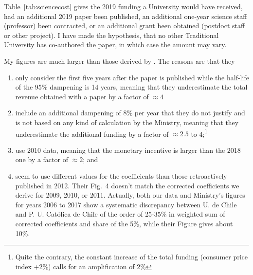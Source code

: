 \documentclass[twocolumn]{article}
\begin{document}
Table~\ref{tab:sciencecost} gives the 2019 funding a University would have received, had an additional 2019 paper been published, an additional one-year science staff (professor) been contracted, or an additional grant been obtained (postdoct staff or other project).  I have made the hypothesis, that no other Traditional University has co-authored the paper, in which case the amount may vary. 

My figures are much larger than those derived by \citet{RAM12}.  The reasons are that they
\begin{enumerate}
\item only consider the first five years after the paper is published while the half-life of the 95\% dampening is 14 years, meaning that they underestimate the total revenue obtained with a paper by a factor of $\approx 4$
\item include an additional dampening of 8\% per year that they do not justify and is not based on any kind of calculation by the Ministry, meaning that they underestimate the additional funding by a factor of $\approx 2.5$ to 4;\footnote{Quite the contrary, the constant increase of the total funding (consumer price index +2\%) calls for an amplification of 2\%}
\item use 2010 data, meaning that the monetary incentive is larger than the 2018 one by a factor of $\approx 2$; and
\item seem to use different values for the coefficients than those retroactively published in 2012. Their Fig.~4 doesn't match the corrected coefficients we derive for 2009, 2010, or 2011. Actually, both our data and Ministry's figures for years 2006 to 2017 show a systematic discrepancy between U. de Chile and P. U. Católica de Chile of the order of 25-35\%  in weighted sum of corrected coefficients and share of the 5\%, while their Figure gives about 10\%.
\end{enumerate}

\appendix
\end{document}
